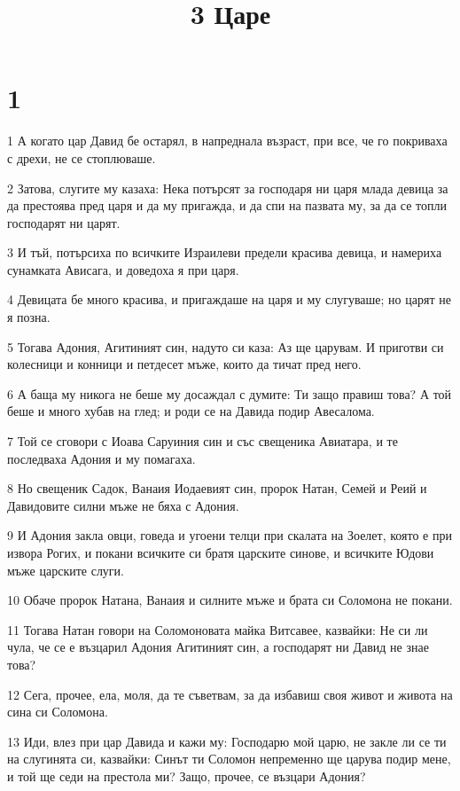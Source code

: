 

\title{3 Царе}


\chapter{1}

\par 1 А когато цар Давид бе остарял, в напреднала възраст, при все, че го покриваха с дрехи, не се стоплюваше.
\par 2 Затова, слугите му казаха: Нека потърсят за господаря ни царя млада девица за да престоява пред царя и да му пригажда, и да спи на пазвата му, за да се топли господарят ни царят.
\par 3 И тъй, потърсиха по всичките Израилеви предели красива девица, и намериха сунамката Ависага, и доведоха я при царя.
\par 4 Девицата бе много красива, и пригаждаше на царя и му слугуваше; но царят не я позна.
\par 5 Тогава Адония, Агитиният син, надуто си каза: Аз ще царувам. И приготви си колесници и конници и петдесет мъже, които да тичат пред него.
\par 6 А баща му никога не беше му досаждал с думите: Ти защо правиш това? А той беше и много хубав на глед; и роди се на Давида подир Авесалома.
\par 7 Той се сговори с Иоава Саруиния син и със свещеника Авиатара, и те последваха Адония и му помагаха.
\par 8 Но свещеник Садок, Ванаия Иодаевият син, пророк Натан, Семей и Реий и Давидовите силни мъже не бяха с Адония.
\par 9 И Адония закла овци, говеда и угоени телци при скалата на Зоелет, която е при извора Рогих, и покани всичките си братя царските синове, и всичките Юдови мъже царските слуги.
\par 10 Обаче пророк Натана, Ванаия и силните мъже и брата си Соломона не покани.
\par 11 Тогава Натан говори на Соломоновата майка Витсавее, казвайки: Не си ли чула, че се е възцарил Адония Агитиният син, а господарят ни Давид не знае това?
\par 12 Сега, прочее, ела, моля, да те съветвам, за да избавиш своя живот и живота на сина си Соломона.
\par 13 Иди, влез при цар Давида и кажи му: Господарю мой царю, не закле ли се ти на слугинята си, казвайки: Синът ти Соломон непременно ще царува подир мене, и той ще седи на престола ми? Защо, прочее, се възцари Адония?
